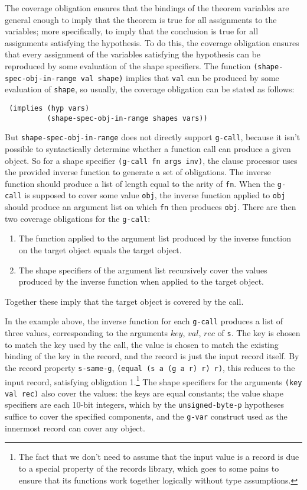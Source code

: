 \documentclass[submission,copyright,creativecommons]{eptcs}
\newcommand*{\var}[1]{\mathit{#1}}
\begin{document}
The coverage obligation ensures that the bindings of the theorem
variables are general enough to imply that the theorem is true for all
assignments to the variables; more specifically, to imply that the
conclusion is true for all assignments satisfying the hypothesis.  To
do this, the coverage obligation ensures that every assignment of the
variables satisfying the hypothesis can be reproduced by some
evaluation of the shape specifiers.  The function
\texttt{(shape-spec-obj-in-range val shape)} implies that \texttt{val}
can be produced by some evaluation of \texttt{shape}, so usually, the
coverage obligation can be stated as follows:
\begin{verbatim}
 (implies (hyp vars)
          (shape-spec-obj-in-range shapes vars))
\end{verbatim}
\noindent But \texttt{shape-spec-obj-in-range} does not directly
support \texttt{g-call}, because it isn't possible to syntactically
determine whether a function call can produce a given object.  So for
a shape specifier \texttt{(g-call fn args inv)}, the clause processor
uses the provided inverse function to generate a set of obligations.
The inverse function should produce a list of length equal to the
arity of \texttt{fn}.  When the \texttt{g-call} is supposed to cover
some value \texttt{obj}, the inverse function applied to \texttt{obj}
should produce an argument list on which \texttt{fn} then produces
\texttt{obj}.  There are then two coverage obligations for the
\texttt{g-call}:
\begin{enumerate}
\item The function applied to the argument list produced by the
  inverse function on the target object equals the target object.
\item The shape specifiers of the argument list recursively cover the
  values produced by the inverse function when applied to the target
  object.
\end{enumerate}
Together these imply that the target object is covered by the call.

In the example above, the inverse function for each \texttt{g-call}
produces a list of three values, corresponding to the arguments
$\var{key}$, $\var{val}$, $\var{rec}$ of \texttt{s}.  The key is
chosen to match the key used by the call, the value is chosen to match
the existing binding of the key in the record, and the record is just
the input record itself.  By the record property \texttt{s-same-g},
\texttt{(equal (s a (g a r) r) r)}, this reduces to the input record,
satisfying obligation 1.\footnote{The fact that we don't need to
  assume that the input value is a record is due to a special property
  of the records library, which goes to some pains to ensure that its
  functions work together logically without type assumptions.}  The
shape specifiers for the arguments \texttt{(key val rec)} also cover the
values: the keys are equal constants; the value shape specifiers are each
10-bit integers, which by the \texttt{unsigned-byte-p} hypotheses
suffice to cover the specified components, and the \texttt{g-var}
construct used as the innermost record can cover any object.
\end{document}
